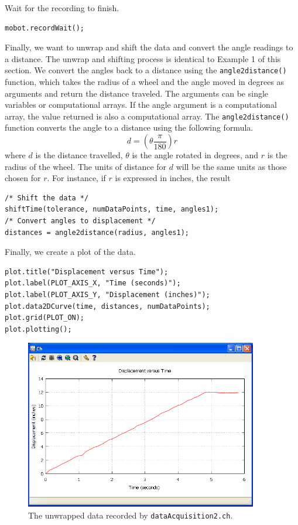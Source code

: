 \documentclass{article}
\begin{document}
Wait for the recording to finish.
\begin{verbatim}
mobot.recordWait();
\end{verbatim}

Finally, we want to unwrap and shift the data and convert the angle readings to a distance.
The unwrap and shifting process is identical to Example 1 of this section. 
We convert the angles back to a distance using the \texttt{angle2distance()} function,
which takes the radius of a wheel and the angle moved in degrees as arguments and
return the distance traveled. The arguments can be single variables or computational
arrays. If the angle argument is a computational array, the value returned is also
a computational array. The \texttt{angle2distance()} function converts the angle
to a distance using the following formula.
\begin{equation*}
d = \left(\theta \frac{\pi}{180}\right) r
\end{equation*}
where $d$ is the distance travelled, $\theta$ is the angle rotated in degrees, and $r$ is the
radius of the wheel. The units of distance for $d$ will be the same units as those
chosen for $r$. For instance, if $r$ is expressed in inches, the result 

\begin{verbatim}
/* Shift the data */
shiftTime(tolerance, numDataPoints, time, angles1);
/* Convert angles to displacement */
distances = angle2distance(radius, angles1);
\end{verbatim}

Finally, we create a plot of the data.
\begin{verbatim}
plot.title("Displacement versus Time");
plot.label(PLOT_AXIS_X, "Time (seconds)");
plot.label(PLOT_AXIS_Y, "Displacement (inches)");
plot.data2DCurve(time, distances, numDataPoints);
plot.grid(PLOT_ON);
plot.plotting();
\end{verbatim}

\begin{figure}[H]
\centering
\includegraphics[width=4in]{images/dataacq3_plot1.png}
\caption{\label{fig:dataacq3_fig1} The unwrapped data recorded by \texttt{dataAcquisition2.ch}.}
\end{figure}
\end{document}
